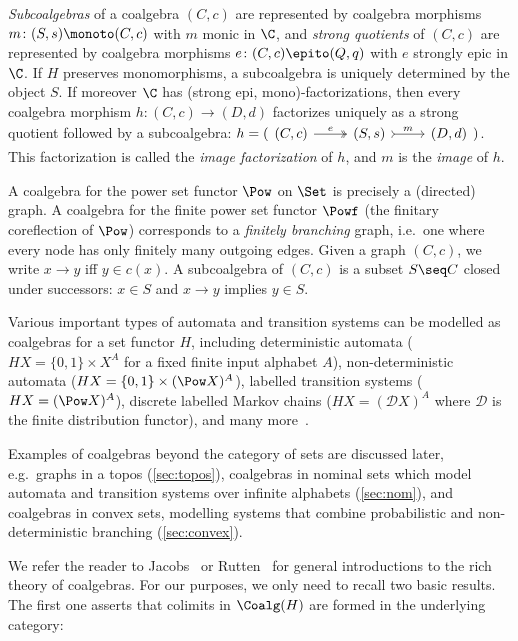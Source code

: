 \emph{Subcoalgebras} of a coalgebra $(C,c)$ are represented by coalgebra morphisms  $m\colon (S,s)\monoto (C,c)$ with $m$ monic in $\C$, and \emph{strong quotients} of $(C,c)$ are represented by coalgebra morphisms $e\colon (C,c)\epito (Q,q)$ with $e$ strongly epic in $\C$. If $H$ preserves monomorphisms, a subcoalgebra is uniquely determined by the object $S$. If moreover $\C$ has (strong epi, mono)-factorizations, then every coalgebra morphism $h\colon (C,c)\to (D,d)$ factorizes uniquely as a strong quotient followed by a subcoalgebra: $h = (\begin{tikzcd} (C,c) \ar[two heads]{r}{e} & (S,s) \ar[tail]{r}{m} & (D,d) \end{tikzcd})$. This factorization is called the \emph{image factorization} of $h$, and $m$ is the \emph{image} of $h$.

\begin{example}[Graphs]\label{ex:coalgebras}
 A coalgebra for the power set functor $\Pow$ on $\Set$ is precisely a (directed) graph. A coalgebra for the finite power set functor $\Powf$ (the finitary coreflection of $\Pow$) corresponds to a \emph{finitely branching} graph, i.e.\ one where every node has only finitely many outgoing edges. Given a graph $(C,c)$, we write $x\to y$ iff $y\in c(x)$. 
A subcoalgebra of $(C,c)$ is a subset $S\seq C$ closed under successors: $x\in S$ and $x\to y$ implies $y\in S$.
\end{example}

\begin{example}
Various important types of automata and transition systems can be modelled as coalgebras for a set functor $H$, including deterministic automata ($HX=\{0,1\}\times X^A$ for a fixed finite input alphabet $A$), non-deterministic automata ($HX=\{0,1\}\times (\Pow X)^A$), labelled transition systems ($HX = (\Pow X)^A$), discrete labelled Markov chains ($HX=(\mathcal{D}X)^A$ where $\mathcal{D}$ is the finite distribution functor), and many more~\cite{jacobs16,rutten00}.
\end{example}

Examples of coalgebras beyond the category of sets are discussed later, e.g.\ graphs in a topos (\autoref{sec:topos}), coalgebras in nominal sets which model automata and transition systems over
  infinite alphabets (\autoref{sec:nom}), and 
  coalgebras in convex sets, modelling systems that combine probabilistic and non-deterministic branching
  (\autoref{sec:convex}).

We refer the reader to Jacobs~\cite{jacobs16} or Rutten~\cite{rutten00} for general introductions to the rich theory of coalgebras. For our purposes, we only need to recall two basic results. The first one asserts that colimits in $\Coalg(H)$ are formed in the underlying category:

